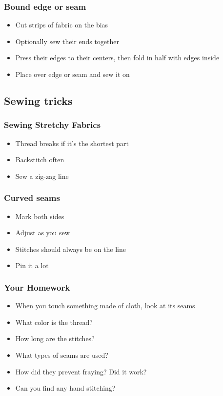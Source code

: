 \documentclass{beamer}
\begin{document}
\begin{frame}[fragile]
\frametitle{Bound edge or seam}
\begin{itemize}
\item Cut strips of fabric on the bias
\item Optionally sew their ends together
\item Press their edges to their centers, then fold in half with edges inside
\item Place over edge or seam and sew it on
\end{itemize}
\end{frame}

\subsection{Sewing tricks}

\begin{frame}[fragile]
\tableofcontents[currentsubsection]
\end{frame}


\begin{frame}[fragile]
\frametitle{Sewing Stretchy Fabrics}
\begin{itemize}
\item Thread breaks if it's the shortest part
\item Backstitch often
\item Sew a zig-zag line
\end{itemize}
\end{frame}

\begin{frame}[fragile]
\frametitle{Curved seams}
\begin{itemize}
\item Mark both sides
\item Adjust as you sew
\item Stitches should always be on the line
\item Pin it a lot
\end{itemize}
\end{frame}

\begin{frame}[fragile]
\frametitle{Your Homework}
\begin{itemize}
\item When you touch something made of cloth, look at its seams
\item What color is the thread?
\item How long are the stitches?
\item What types of seams are used?
\item How did they prevent fraying? Did it work?
\item Can you find any hand stitching?
\end{itemize}
\end{frame}
\end{document}
